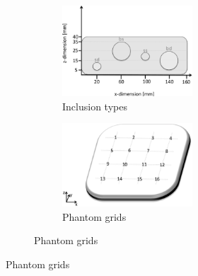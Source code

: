 \begin{figure}[]
\begin{subfigure}[b]{0.53\textwidth}
		\begin{subfigure}[b]{\textwidth}
			\centering
			\begin{subfigure}[b]{0.51\textwidth}
				\includegraphics[width=\textwidth]{./figs/phside.eps}
				\caption{Inclusion types}
				\label{phantomgrid:description}
			\end{subfigure}
			\begin{subfigure}[b]{0.46\textwidth}
				\includegraphics[width=\textwidth]{./figs/phlocations.eps}
				\caption{Phantom grids}
				\label{phantomgrid:3d}
			\end{subfigure} 
		\end{subfigure}
	\end{subfigure}
	\caption{}
	\label{robot-set-up}
	
\end{figure}
